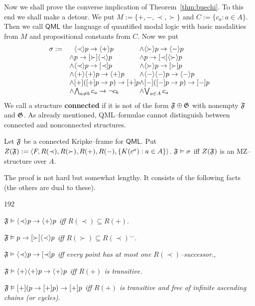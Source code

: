 Now we shall prove the converse implication of 
Theorem~\ref{thm:buechi}. To this end we shall make a detour. We put 
$M := \{+,-,\prec, \succ\}$ and $C := \{c_a : a \in A\}$.
Then we call $\mathsf{QML}$ the language of quantified modal logic 
with basic modalities from $M$ and propositional constants from 
$C$. Now we put
\begin{equation}
\begin{array}{ll@{}l@{\und}l}
\sigma := &  & \auf\prec\zu p \pf \auf +\zu p &
    \auf\succ\zu p \pf \auf-\zu p \\
  & \und & p \pf [\succ] \auf\prec\zu p &
    p \pf [\prec]\auf \succ\zu p \\
  & \und & \auf \prec \zu p \pf [\prec]p &
    \auf\succ\zu p \pf [\succ]p \\
  & \und & \auf+\zu\auf+\zu p \pf \auf+\zu p
    & \auf-\zu\auf-\zu p \pf \auf-\zu p \\
  & \und & [+]([+] p \pf p) \pf [+] p &
    [-]([-]p \pf p) \pf [-]p  \\
  & \und & \gund_{a \neq b} c_a \pf \nicht c_b 
   & \goder_{a \in A} c_a
\end{array}
\end{equation}
We call a structure \textbf{connected} if it is not of the form
$\mathfrak{F} \oplus \mathfrak{G}$ with nonempty $\mathfrak{F}$ and $\mathfrak{G}$. As already 
mentioned, QML--formulae cannot distinguish between 
connected and nonconnected structures.
\begin{thm}
Let $\mathfrak{F}$ be a connected Kripke--frame for $\mathsf{QML}$.
Put $Z(\mathfrak{F}) := \langle F, R(\prec), R(\succ), R(+), R(-),
\{K(c^a) : a \in A\}\rangle$. $\mathfrak{F} \vDash \sigma$ iff
$Z(\mathfrak{F})$ is an MZ--struc\-ture over $A$.
\end{thm}
\proofbeg
The proof is not hard but somewhat lengthy. It consists of the 
following facts (the others are dual to these).
\begin{dingautolist}{192}
\item 
{\it $\mathfrak{F} \vDash \langle\prec\rangle p \rightarrow \langle +\rangle p$ 
iff $R(\prec) \subseteq R(+)$}. 
\item {\it $\mathfrak{F} \vDash p \rightarrow [\succ] \langle\prec\rangle p$ iff
$R(\succ) \subseteq R(\prec)^{\smallsmile}$.} 
\item
{\it $\mathfrak{F} \vDash \langle \prec\rangle p \rightarrow [\prec] p$ iff
every point has at most one $R(\prec)$--successor.}, 
\item 
{\it $\mathfrak{F} \vDash
\langle+\rangle\langle+\rangle p \rightarrow \langle+\rangle p$ iff $R(+)$ is
transitive.} 
\item
{\it $\mathfrak{F} \vDash [+](p \rightarrow [+] p) \rightarrow [+] p$ iff 
$R(+)$ is transitive and free of infinite ascending chains 
	(or cycles).} 
\end{dingautolist}
